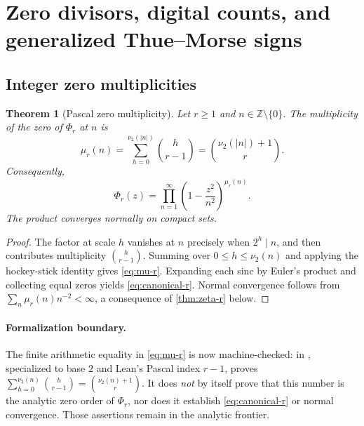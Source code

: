 \documentclass[11pt,a4paper]{article}
\theoremstyle{frontier}
\newtheorem{theorem}{Theorem}[section]
\theoremstyle{definition}
\newcommand{\Z}{\mathbb Z}
\begin{document}
\section{Zero divisors, digital counts, and generalized Thue--Morse signs}\label{sec:digital}

\subsection{Integer zero multiplicities}

\begin{theorem}[Pascal zero multiplicity]\label{thm:zero-multiplicity}
Let $r\ge1$ and $n\in\Z\setminus\{0\}$.  The multiplicity of the zero of $\Phi_r$ at $n$ is
\begin{equation}\label{eq:mu-r}
  \mu_r(n)=\sum_{h=0}^{\nu_2(|n|)}\binom h{r-1}
  =\binom{\nu_2(|n|)+1}{r}.
\end{equation}
Consequently,
\begin{equation}\label{eq:canonical-r}
  \Phi_r(z)=\prod_{n=1}^{\infty}
  \left(1-\frac{z^2}{n^2}\right)^{\mu_r(n)}.
\end{equation}
The product converges normally on compact sets.
\end{theorem}

\begin{proof}
The factor at scale $h$ vanishes at $n$ precisely when $2^h\mid n$, and then contributes multiplicity $\binom h{r-1}$.  Summing over $0\le h\le\nu_2(n)$ and applying the hockey-stick identity gives \eqref{eq:mu-r}.  Expanding each sinc by Euler's product and collecting equal zeros yields \eqref{eq:canonical-r}.  Normal convergence follows from
$\sum_n\mu_r(n)n^{-2}<\infty$, a consequence of \cref{thm:zeta-r} below.
\end{proof}

\paragraph{Formalization boundary.}
The finite arithmetic equality in \eqref{eq:mu-r} is now machine-checked:
 in
, specialized to base $2$ and Lean's
Pascal index $r-1$, proves
$\sum_{h=0}^{\nu_2(n)}\binom h{r-1}=\binom{\nu_2(n)+1}r$.
It does \emph{not} by itself prove that this number is the analytic zero
order of $\Phi_r$, nor does it establish \eqref{eq:canonical-r} or normal
convergence.  Those assertions remain in the analytic frontier.
\end{document}

